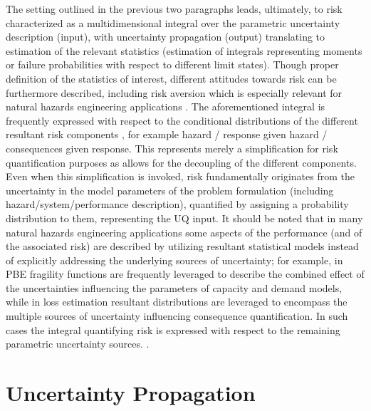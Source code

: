The setting outlined in the previous two paragraphs leads, ultimately, to risk characterized as a multidimensional integral over the parametric uncertainty description (input), with uncertainty propagation (output) translating to estimation of the relevant statistics (estimation of integrals representing moments or failure probabilities with respect to different limit states). Though proper definition of the statistics of interest, different attitudes towards risk can be furthermore described, including risk aversion which is especially relevant for natural hazards engineering applications \citep{cha2012riskaverse}. The aforementioned integral is frequently expressed with respect to the conditional distributions of the different resultant risk components \citep{goulet2007evaluation,barbato2013performancebased}, for example {hazard / response given hazard / consequences given response}. This represents merely a simplification for risk quantification purposes as allows for the decoupling of the different components. Even when this simplification is invoked, risk fundamentally originates from the uncertainty in the model parameters of the problem formulation (including hazard/system/performance description), quantified by assigning a probability distribution to them, representing the UQ input. It should be noted that in many natural hazards engineering applications some aspects of the performance (and of the associated risk) are described by utilizing resultant statistical models instead of explicitly addressing the underlying sources of uncertainty; for example, in PBE fragility functions are frequently leveraged to describe the combined effect of the uncertainties influencing the parameters of capacity and demand models, while in loss estimation resultant distributions are leveraged to encompass the multiple sources of uncertainty influencing consequence quantification. In such cases the integral quantifying risk is expressed with respect to the remaining parametric uncertainty sources.      . 

\section{Uncertainty Propagation}
\label{sec:uq_propagation}

